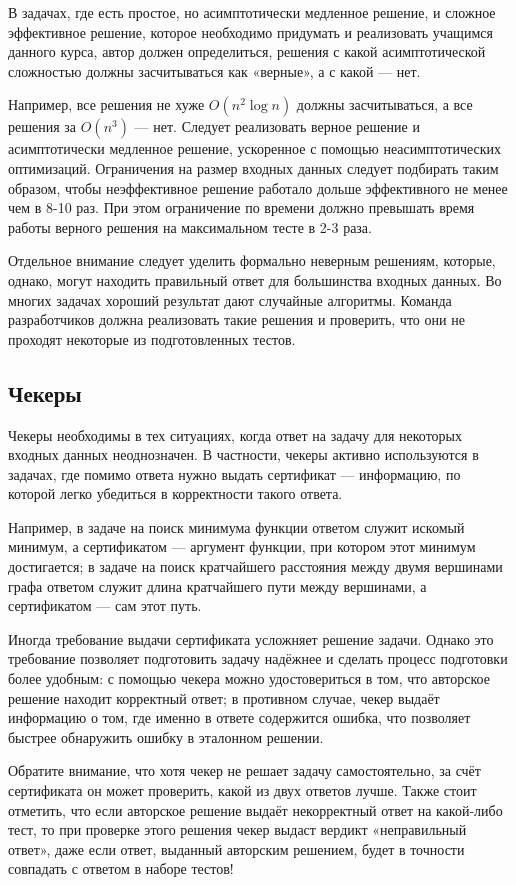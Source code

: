 В задачах, где есть простое, но асимптотически медленное решение, и сложное эффективное решение, которое необходимо придумать и реализовать учащимся данного курса, автор должен определиться, решения с какой асимптотической сложностью должны засчитываться как «верные», а с какой — нет. 


Например, все решения не хуже $O(n^2\log{}n)$ должны засчитываться, а все решения за $O(n^3)$ — нет. Следует реализовать верное решение и асимптотически медленное решение, ускоренное с помощью неасимптотических оптимизаций. Ограничения на размер входных данных следует подбирать таким образом, чтобы неэффективное решение работало дольше эффективного не менее чем в 8-10 раз. При этом ограничение по времени должно превышать время работы верного решения на максимальном тесте в 2-3 раза.

Отдельное внимание следует уделить формально неверным решениям, которые, однако, могут находить правильный ответ для большинства входных данных. Во многих задачах хороший результат дают случайные алгоритмы. Команда разработчиков должна реализовать такие решения и проверить, что они не проходят некоторые из подготовленных тестов.

\subsection{Чекеры}
Чекеры необходимы в тех ситуациях, когда ответ на задачу для некоторых входных данных неоднозначен. В частности, чекеры активно используются в задачах, где помимо ответа нужно выдать сертификат — информацию, по которой легко убедиться в корректности такого ответа. 

Например, в задаче на поиск минимума функции ответом служит искомый минимум, а сертификатом — аргумент функции, при котором этот минимум достигается; в задаче на поиск кратчайшего расстояния между двумя вершинами графа ответом служит длина кратчайшего пути между вершинами, а сертификатом — сам этот путь. 

Иногда требование выдачи сертификата усложняет решение задачи. Однако это требование позволяет подготовить задачу надёжнее и сделать процесс подготовки более удобным: с помощью чекера можно удостовериться в том, что авторское решение находит корректный ответ; в противном случае, чекер выдаёт информацию о том, где именно в ответе содержится ошибка, что позволяет быстрее обнаружить ошибку в эталонном решении. 

Обратите внимание, что хотя чекер не решает задачу самостоятельно, за счёт сертификата он может проверить, какой из двух ответов лучше. Также стоит отметить, что если авторское решение выдаёт некорректный ответ на какой-либо тест, то при проверке этого решения чекер выдаст вердикт «неправильный ответ», даже если ответ, выданный авторским решением, будет в точности совпадать с ответом в наборе тестов!

